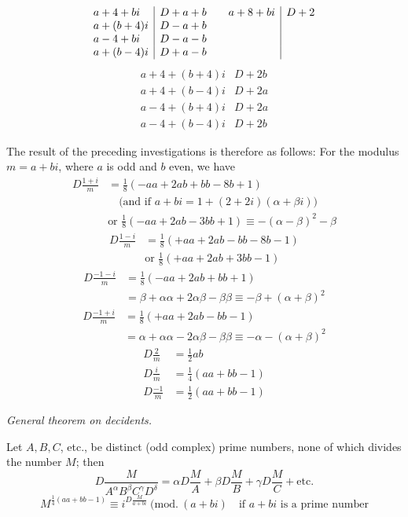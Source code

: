 \[
\begin{array}{l|l@{\qquad}l|l}
a+4+bi&D+a+b&a+8+bi&D+2\\
a+(b+4)i&D-a+b&&\\
a-4+bi&D-a-b&&\\
a+(b-4)i&D+a-b&&
\end{array}
\]
\[
\begin{array}{l|l}
a+4+(b+4)i&D+2b\\
a+4+(b-4)i&D+2a\\
a-4+(b+4)i&D+2a\\
a-4+(b-4)i&D+2b
\end{array}
\]

The result of the preceding investigations is therefore as follows:
For the modulus $m=a+bi$, where $a$ is odd and $b$ even, we have
\[
\begin{aligned}
D\frac{1+i}{m}&=\tfrac18(-aa+2ab+bb-8b+1)\\
&\quad\text{(and if }a+bi=1+(2+2i)(\alpha+\beta i))\\
&\text{or }\tfrac18(-aa+2ab-3bb+1)\equiv-(\alpha-\beta)^2-\beta
\end{aligned}
\]
\[
\begin{aligned}
D\frac{1-i}{m}&=\tfrac18(+aa+2ab-bb-8b-1)\\
&\text{or }\tfrac18(+aa+2ab+3bb-1)
\end{aligned}
\]
\[
\begin{aligned}
D\frac{-1-i}{m}&=\tfrac18(-aa+2ab+bb+1)\\
&=\beta+\alpha\alpha+2\alpha\beta-\beta\beta\equiv-\beta+(\alpha+\beta)^2
\end{aligned}
\]
\[
\begin{aligned}
D\frac{-1+i}{m}&=\tfrac18(+aa+2ab-bb-1)\\
&=\alpha+\alpha\alpha-2\alpha\beta-\beta\beta\equiv-\alpha-(\alpha+\beta)^2
\end{aligned}
\]
\[
\begin{aligned}
D\frac2m&=\tfrac12ab\\
D\frac im&=\tfrac14(aa+bb-1)\\
D\frac{-1}m&=\tfrac12(aa+bb-1)
\end{aligned}
\]

\begin{center}\emph{General theorem on decidents.}\end{center}
Let $A,B,C$, etc., be distinct (odd complex) prime numbers, none of which divides the number $M$; then
\[
D\frac{M}{A^\alpha B^\beta C^\gamma D^\delta}=\alpha D\frac MA+\beta D\frac MB+\gamma D\frac MC+\text{etc.}
\]
\[
M^{\frac14(aa+bb-1)}\equiv i^{D\frac{M}{a+bi}}\ (\mathrm{mod.}\ (a+bi)\quad\text{if }a+bi\text{ is a prime number}
\]

